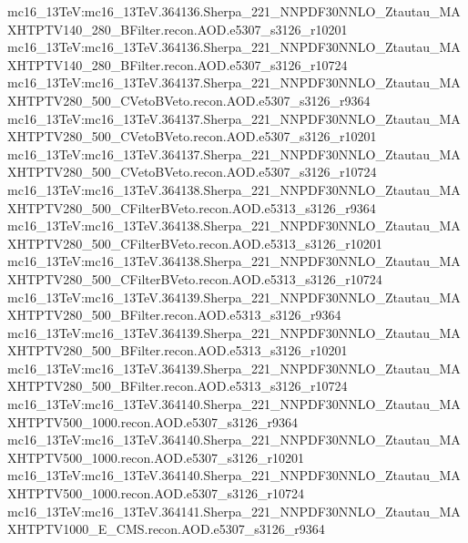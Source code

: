 { mc16\_13TeV:mc16\_13TeV.364136.Sherpa\_221\_NNPDF30NNLO\_Ztautau\_MAXHTPTV140\_280\_BFilter.recon.AOD.e5307\_s3126\_r10201 \newline  
 mc16\_13TeV:mc16\_13TeV.364136.Sherpa\_221\_NNPDF30NNLO\_Ztautau\_MAXHTPTV140\_280\_BFilter.recon.AOD.e5307\_s3126\_r10724 \newline  
 mc16\_13TeV:mc16\_13TeV.364137.Sherpa\_221\_NNPDF30NNLO\_Ztautau\_MAXHTPTV280\_500\_CVetoBVeto.recon.AOD.e5307\_s3126\_r9364   \newline
 mc16\_13TeV:mc16\_13TeV.364137.Sherpa\_221\_NNPDF30NNLO\_Ztautau\_MAXHTPTV280\_500\_CVetoBVeto.recon.AOD.e5307\_s3126\_r10201 \newline  
 mc16\_13TeV:mc16\_13TeV.364137.Sherpa\_221\_NNPDF30NNLO\_Ztautau\_MAXHTPTV280\_500\_CVetoBVeto.recon.AOD.e5307\_s3126\_r10724 \newline  
 mc16\_13TeV:mc16\_13TeV.364138.Sherpa\_221\_NNPDF30NNLO\_Ztautau\_MAXHTPTV280\_500\_CFilterBVeto.recon.AOD.e5313\_s3126\_r9364 \newline  
 mc16\_13TeV:mc16\_13TeV.364138.Sherpa\_221\_NNPDF30NNLO\_Ztautau\_MAXHTPTV280\_500\_CFilterBVeto.recon.AOD.e5313\_s3126\_r10201 \newline  
 mc16\_13TeV:mc16\_13TeV.364138.Sherpa\_221\_NNPDF30NNLO\_Ztautau\_MAXHTPTV280\_500\_CFilterBVeto.recon.AOD.e5313\_s3126\_r10724  \newline 
 mc16\_13TeV:mc16\_13TeV.364139.Sherpa\_221\_NNPDF30NNLO\_Ztautau\_MAXHTPTV280\_500\_BFilter.recon.AOD.e5313\_s3126\_r9364\newline   
 mc16\_13TeV:mc16\_13TeV.364139.Sherpa\_221\_NNPDF30NNLO\_Ztautau\_MAXHTPTV280\_500\_BFilter.recon.AOD.e5313\_s3126\_r10201\newline   
 mc16\_13TeV:mc16\_13TeV.364139.Sherpa\_221\_NNPDF30NNLO\_Ztautau\_MAXHTPTV280\_500\_BFilter.recon.AOD.e5313\_s3126\_r10724 \newline  
 mc16\_13TeV:mc16\_13TeV.364140.Sherpa\_221\_NNPDF30NNLO\_Ztautau\_MAXHTPTV500\_1000.recon.AOD.e5307\_s3126\_r9364 \newline  
 mc16\_13TeV:mc16\_13TeV.364140.Sherpa\_221\_NNPDF30NNLO\_Ztautau\_MAXHTPTV500\_1000.recon.AOD.e5307\_s3126\_r10201 \newline  
 mc16\_13TeV:mc16\_13TeV.364140.Sherpa\_221\_NNPDF30NNLO\_Ztautau\_MAXHTPTV500\_1000.recon.AOD.e5307\_s3126\_r10724  \newline 
 mc16\_13TeV:mc16\_13TeV.364141.Sherpa\_221\_NNPDF30NNLO\_Ztautau\_MAXHTPTV1000\_E\_CMS.recon.AOD.e5307\_s3126\_r9364  \newline 
}
